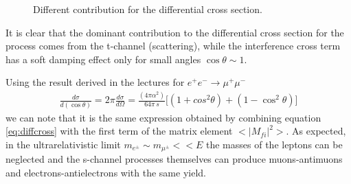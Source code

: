 \documentclass[10pt,a4paper]{article}
\begin{document}
\begin{figure}[!ht]
\centerline{
}
\caption{Different contribution for the differential cross section.}
\label{fig:CScontribs}
\end{figure}

It is clear that the dominant contribution to the differential cross section for the process comes from the t-channel (scattering), while the interference cross term has a soft damping effect only for small angles $\cos\theta\sim1$.

Using the result derived in the lectures for $e^+e^-\rightarrow\mu^+\mu^-$
\begin{align*}
\frac{d\sigma}{d(\cos\theta)} = 2\pi\frac{d\sigma}{d\Omega} = \frac{(4\pi\alpha^2)}{64\pi\,s}\bigg[ (1+cos^2\theta) + (1-\cos^2\theta) \bigg]
\end{align*}
we can note that it is the same expression obtained by combining equation \ref{eq:diffcross} with the first term of the matrix element $<|M_{fi}|^2>$. As expected, in the ultrarelativistic limit $m_{e^{\pm}}\sim m_{\mu^{\pm}} << E$ the masses of the leptons can be neglected and the s-channel processes themselves can produce muons-antimuons and electrons-antielectrons with the same yield.
\end{document}
